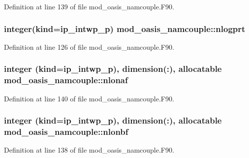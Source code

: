 Definition at line 139 of file mod\+\_\+oasis\+\_\+namcouple.\+F90.

\hypertarget{classmod__oasis__namcouple_a7b8c924fdea622759b99d8f61e03ade5}{
\subsubsection[{nlogprt}]{\setlength{\rightskip}{0pt plus 5cm}integer(kind=ip\+\_\+intwp\+\_\+p) mod\+\_\+oasis\+\_\+namcouple\+::nlogprt\hspace{0.3cm}{\ttfamily [private]}}}\label{classmod__oasis__namcouple_a7b8c924fdea622759b99d8f61e03ade5}


Definition at line 126 of file mod\+\_\+oasis\+\_\+namcouple.\+F90.

\hypertarget{classmod__oasis__namcouple_ae413f2dc402b7c018e341081b8d6e208}{
\subsubsection[{nlonaf}]{\setlength{\rightskip}{0pt plus 5cm}integer (kind=ip\+\_\+intwp\+\_\+p), dimension(\+:), allocatable mod\+\_\+oasis\+\_\+namcouple\+::nlonaf\hspace{0.3cm}{\ttfamily [private]}}}\label{classmod__oasis__namcouple_ae413f2dc402b7c018e341081b8d6e208}


Definition at line 140 of file mod\+\_\+oasis\+\_\+namcouple.\+F90.

\hypertarget{classmod__oasis__namcouple_a6e774d31f16b513b1d604e72a82dff40}{
\subsubsection[{nlonbf}]{\setlength{\rightskip}{0pt plus 5cm}integer (kind=ip\+\_\+intwp\+\_\+p), dimension(\+:), allocatable mod\+\_\+oasis\+\_\+namcouple\+::nlonbf\hspace{0.3cm}{\ttfamily [private]}}}\label{classmod__oasis__namcouple_a6e774d31f16b513b1d604e72a82dff40}


Definition at line 138 of file mod\+\_\+oasis\+\_\+namcouple.\+F90.

